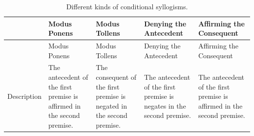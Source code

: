 \documentclass[
]{krantz}
\begin{document}
\begin{longtable}[]{@{}
  >{\raggedright\arraybackslash}p{}
  >{\raggedright\arraybackslash}p{}
  >{\raggedright\arraybackslash}p{}
  >{\raggedright\arraybackslash}p{}
  >{\raggedright\arraybackslash}p{}@{}}
\caption{\label{tab:Syllogisms} Different kinds of conditional syllogisms.}\tabularnewline
\toprule\noalign{}
\begin{minipage}[b]{\linewidth}\raggedright
\end{minipage} & \begin{minipage}[b]{\linewidth}\raggedright
Modus Ponens
\end{minipage} & \begin{minipage}[b]{\linewidth}\raggedright
Modus Tollens
\end{minipage} & \begin{minipage}[b]{\linewidth}\raggedright
Denying the Antecedent
\end{minipage} & \begin{minipage}[b]{\linewidth}\raggedright
Affirming the Consequent
\end{minipage} \\
\midrule\noalign{}
\endfirsthead
\toprule\noalign{}
\begin{minipage}[b]{\linewidth}\raggedright
\end{minipage} & \begin{minipage}[b]{\linewidth}\raggedright
Modus Ponens
\end{minipage} & \begin{minipage}[b]{\linewidth}\raggedright
Modus Tollens
\end{minipage} & \begin{minipage}[b]{\linewidth}\raggedright
Denying the Antecedent
\end{minipage} & \begin{minipage}[b]{\linewidth}\raggedright
Affirming the Consequent
\end{minipage} \\
\midrule\noalign{}
\endhead
\bottomrule\noalign{}
\endlastfoot
Description & The antecedent of the first premise is affirmed in the second premise. & The consequent of the first premise is negated in the second premise. & The antecedent of the first premise is negates in the second premise. & The antecedent of the first premise is affirmed in the second premise. \\

\end{longtable}
\end{document}
